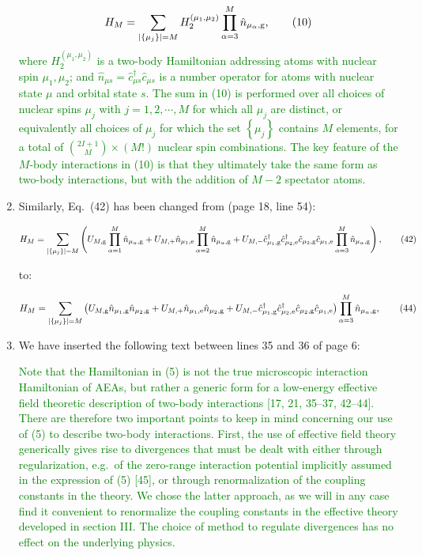 \documentclass[preprint]{revtex4-1}
\newcommand{\p}[1]{\left(#1\right)} %
\renewcommand{\set}[1]{\left\{#1\right\}} %
\newcommand{\g}{\text{g}}
\newcommand{\e}{\text{e}}
\renewcommand{\c}{\hat{c}}
\newcommand{\n}{\hat{n}}
\newcommand{\1}{\mathds{1}}
\newcommand{\red}[1]{\textcolor{red}{#1}}
\newcommand{\green}[1]{\textcolor{green}{#1}}
\newcounter{point}
\newcommand{\step}{\stepcounter{point}\setcounter{enumi}{0}}
\begin{document}
\begin{enumerate}[label=(R1.\arabic{point}.\arabic*)]
  \green{\begin{align*}
      H_M = \sum_{\abs{\set{\mu_j}}=M}
      H_2^{(\mu_1,\mu_2)} \prod_{\alpha=3}^M \n_{\mu_\alpha,\g},
      \tag{10}
    \end{align*}
    where $H_2^{(\mu_1,\mu_2)}$ is a two-body Hamiltonian addressing
    atoms with nuclear spin $\mu_1,\mu_2$; and
    $\n_{\mu s}=\c_{\mu s}^\dag\c_{\mu s}$ is a number operator for
    atoms with nuclear state $\mu$ and orbital state $s$.  The sum in
    (10) is performed over all choices of nuclear spins $\mu_j$ with
    $j=1,2,\cdots,M$ for which all $\mu_j$ are distinct, or
    equivalently all choices of $\mu_j$ for which the set
    $\set{\mu_j}$ contains $M$ elements, for a total of
    ${2I+1\choose M}\times\p{M!}$ nuclear spin combinations.  The key
    feature of the $M$-body interactions in (10) is that they
    ultimately take the same form as two-body interactions, but with
    the addition of $M-2$ spectator atoms.}


\item Similarly, Eq.~(42) has been changed from (page 18, line 54):

  \red{\begin{align*}
      H_M = \sum_{\abs{\set{\mu_j}}=M}
      \p{U_{M,\g} \prod_{\alpha=1}^M \n_{\mu_\alpha,\g}
        + U_{M,+} \n_{\mu_1,\e} \prod_{\alpha=2}^M \n_{\mu_\alpha,\g}
        + U_{M,-} \c_{\mu_1,\g}^\dag \c_{\mu_2,\e}^\dag
        \c_{\mu_2,\g} \c_{\mu_1,\e} \prod_{\alpha=3}^M \n_{\mu_\alpha,\g}},
      \tag{42}
    \end{align*}}

  to:

  \green{\begin{align*}
      H_M = \sum_{\abs{\set{\mu_j}}=M}
      \p{U_{M,\g} \n_{\mu_1,\g} \n_{\mu_2,\g}
        + U_{M,+} \n_{\mu_1,\e} \n_{\mu_2,\g}
        + U_{M,-} \c_{\mu_1,\g}^\dag \c_{\mu_2,\e}^\dag
        \c_{\mu_2,\g} \c_{\mu_1,\e}}
      \prod_{\alpha=3}^M \n_{\mu_\alpha,\g},
      \tag{44}
    \end{align*}}


  \step
\item We have inserted the following text between lines 35 and 36 of
  page 6:

  \green{Note that the Hamiltonian in (5) is not the true microscopic
    interaction Hamiltonian of AEAs, but rather a generic form for a
    low-energy effective field theoretic description of two-body
    interactions [17, 21, 35--37, 42--44].  There are therefore two
    important points to keep in mind concerning our use of (5) to
    describe two-body interactions.  First, the use of effective field
    theory generically gives rise to divergences that must be dealt
    with either through regularization, e.g.~of the zero-range
    interaction potential implicitly assumed in the expression of (5)
    [45], or through renormalization of the coupling constants in the
    theory.  We chose the latter approach, as we will in any case find
    it convenient to renormalize the coupling constants in the
    effective theory developed in section III.  The choice of method
    to regulate divergences has no effect on the underlying physics.}


\end{enumerate}
\end{document}
